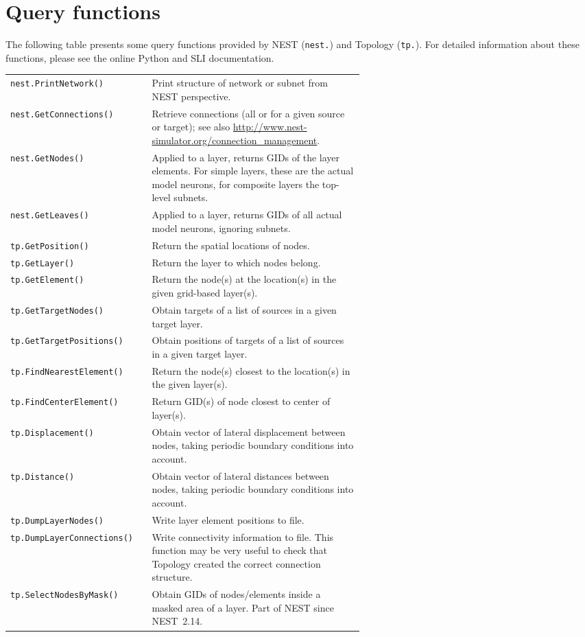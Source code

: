 \documentclass[a4paper,12pt]{report}
\begin{document}
\section{Query functions}\label{sec:queries}

The following table presents some query functions provided by NEST
(\lstinline!nest.!) and Topology (\lstinline!tp.!). For detailed
information about these functions, please see the online Python and
SLI documentation.

\renewcommand{\arraystretch}{1.2}
\begin{longtable}{lp{0.6\linewidth}}
  \lstinline!nest.PrintNetwork()! & Print structure of network or
  subnet
  from NEST perspective. \\
  \lstinline!nest.GetConnections()! & Retrieve connections
  (all or for a given source or target); see also
  \url{http://www.nest-simulator.org/connection_management}. \\
  \lstinline!nest.GetNodes()! & Applied to a layer, returns GIDs of
  the layer elements. For simple layers, these are the actual model
  neurons,
  for composite layers the top-level subnets.\\
  \lstinline!nest.GetLeaves()! & Applied to a layer, returns GIDs of
  all
  actual model neurons, ignoring subnets.\\
  \lstinline!tp.GetPosition()!  &
  Return the spatial locations of nodes.\\
  \lstinline!tp.GetLayer()!  &
  Return the layer to which nodes belong.\\
  \lstinline!tp.GetElement()!  &
  Return the node(s) at the location(s) in the given grid-based layer(s).\\
  \lstinline!tp.GetTargetNodes()!  &
  Obtain targets of a list of sources in a given target layer.\\
  \lstinline!tp.GetTargetPositions()!  &
  Obtain positions of targets of a list of sources in a given target layer.\\
  \lstinline!tp.FindNearestElement()!  & Return the node(s) closest to
  the location(s) in the given
  layer(s).\\
  \lstinline!tp.FindCenterElement()!  &
  Return GID(s) of node closest to center of layer(s).\\
  \lstinline!tp.Displacement()!  & Obtain vector of lateral
  displacement between nodes, taking
  periodic boundary conditions into account. \\
  \lstinline!tp.Distance()!  & Obtain vector of lateral distances
  between nodes, taking periodic
  boundary conditions into account.\\
  \lstinline!tp.DumpLayerNodes()!  &
  Write layer element positions to file.\\
  \lstinline!tp.DumpLayerConnections()!  & Write connectivity
  information to file. This function may be very useful to check that
  Topology created the correct connection structure.\\
  \lstinline!tp.SelectNodesByMask()! & Obtain GIDs of nodes/elements inside a
  masked area of a layer. Part of NEST since NEST~2.14.
\end{longtable}
\end{document}

